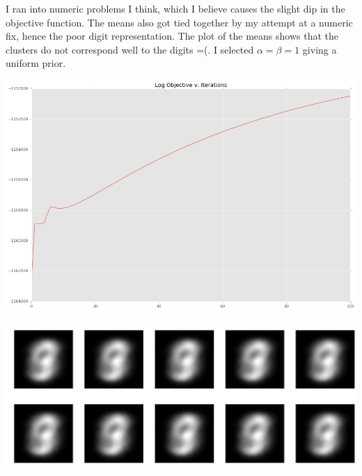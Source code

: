 \documentclass[12pt,letterpaper,fleqn]{hmcpset}
\begin{document}
I ran into numeric problems I think, which I believe causes the slight dip in the objective function. The means also got tied together by my attempt at a numeric fix, hence the poor digit representation. The plot of the means shows that the clusters do not correspond well to the digits =(. I selected $\alpha = \beta = 1$ giving a uniform prior.

\includegraphics[scale = .5]{p4_objective_1.png}\\\\
\includegraphics[scale = .25]{p4means.png}\\\\


\newpage
\end{document}
